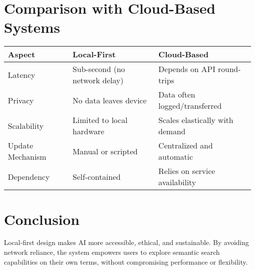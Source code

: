 \section{Comparison with Cloud-Based Systems}
{\small
\begin{tabular}{@{}p{4.5cm} p{4.5cm} p{4.5cm}@{}}
\toprule
\textbf{Aspect} & \textbf{Local-First} & \textbf{Cloud-Based} \\
\midrule
Latency & Sub-second (no network delay) & Depends on API round-trips \\
Privacy & No data leaves device & Data often logged/transferred \\
Scalability & Limited to local hardware & Scales elastically with demand \\
Update Mechanism & Manual or scripted & Centralized and automatic \\
Dependency & Self-contained & Relies on service availability \\
\bottomrule
\end{tabular}
}

\section{Conclusion}
Local-first design makes AI more accessible, ethical, and sustainable. By avoiding network reliance, the system empowers users to explore semantic search capabilities on their own terms, without compromising performance or flexibility.

